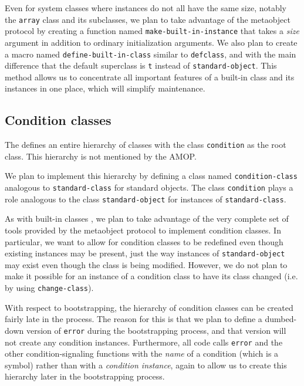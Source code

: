 Even for system classes where instances do not all have the same size,
notably the \texttt{array} class and its subclasses, we plan to take
advantage of the metaobject protocol by creating a function named
\texttt{make-built-in-instance} that takes a \emph{size} argument in
addition to ordinary initialization arguments.  We also plan to create
a macro named \texttt{define-built-in-class} similar to
\texttt{defclass}, and with the main difference that the default
superclass is \texttt{t} instead of \texttt{standard-object}.  This
method allows us to concentrate all important features of a built-in
class and its instances in one place, which will simplify
maintenance. 

\subsection{Condition classes}
\label{object-system-condition-classes}

The \hs{} defines an entire hierarchy of classes with the class
\texttt{condition} as the root class.  This hierarchy is not mentioned
by the AMOP.  

We plan to implement this hierarchy by defining a class named
\texttt{condition-class} analogous to \texttt{standard-class} for
standard objects.  The class \texttt{condition} plays a role analogous
to the class \texttt{standard-object} for instances of
\texttt{standard-class}. 

As with built-in classes , we
plan to take advantage of the very complete set of tools provided by
the metaobject protocol to implement condition classes.  In
particular, we want to allow for condition classes to be redefined
even though existing instances may be present, just the way instances
of \texttt{standard-object} may exist even though the class is being
modified.  However, we do not plan to make it possible for an instance
of a condition class to have its class changed (i.e. by using
\texttt{change-class}).  

With respect to bootstrapping, the hierarchy of condition classes can
be created fairly late in the process.  The reason for this is that we
plan to define a dumbed-down version of \texttt{error} during the
bootstrapping process, and that version will not create any condition
instances.  Furthermore, all \sysname{} code calls \texttt{error} and
the other condition-signaling functions with the \emph{name} of a
condition (which is a symbol) rather than with a \emph{condition
  instance}, again to allow us to create this hierarchy later in the
bootstrapping process. 

